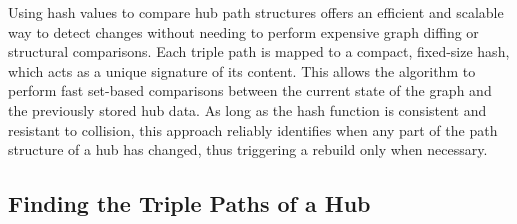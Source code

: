 Using hash values to compare hub path structures offers an efficient and scalable way to detect changes without needing to perform expensive graph diffing or structural comparisons. Each triple path is mapped to a compact, fixed-size hash, which acts as a unique signature of its content. This allows the algorithm to perform fast set-based comparisons between the current state of the graph and the previously stored hub data. As long as the hash function is consistent and resistant to collision, this approach reliably identifies when any part of the path structure of a hub has changed, thus triggering a rebuild only when necessary.


\subsection{Finding the Triple Paths of a Hub}

